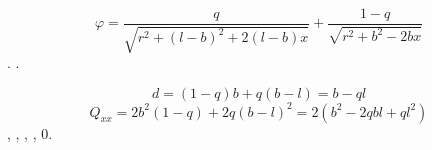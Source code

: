 \documentclass[a4paper]{article}
\begin{document}
\begin{equation*}
\varphi =\frac q{\sqrt{r^2+(l-b)^2+2(l-b)x}}+\frac{1-q}{\sqrt{r^2+b^2-2\mathit{bx}}}
\end{equation*}
{\CYRP}{\cyro}{\cyrt}{\cyre}{\cyrn}{\cyrc}{\cyri}{\cyra}{\cyrl} {\cyrt}{\cyra}{\cyrk}{\cyro}{\cyrishrt}
{\cyrs}{\cyri}{\cyrs}{\cyrt}{\cyre}{\cyrm}{\cyrery} {\cyrm}{\cyro}{\cyrzh}{\cyrn}{\cyro}
{\cyrp}{\cyrr}{\cyre}{\cyrd}{\cyrs}{\cyrt}{\cyra}{\cyrv}{\cyri}{\cyrt}{\cyrsftsn} {\cyrv} {\cyrv}{\cyri}{\cyrd}{\cyre}
{\cyrs}{\cyru}{\cyrm}{\cyrm}{\cyrery}
{\cyrk}{\cyru}{\cyrl}{\cyro}{\cyrn}{\cyro}{\cyrv}{\cyrs}{\cyrk}{\cyro}{\cyrg}{\cyro} {\cyri}
{\cyrd}{\cyri}{\cyrp}{\cyro}{\cyrl}{\cyrsftsn}{\cyrn}{\cyro}{\cyrg}{\cyro}
{\cyrp}{\cyro}{\cyrt}{\cyre}{\cyrn}{\cyrc}{\cyri}{\cyra}{\cyrl}{\cyra}.
{\CYRR}{\cyra}{\cyrs}{\cyrs}{\cyrch}{\cyri}{\cyrt}{\cyra}{\cyre}{\cyrm}
{\cyrd}{\cyri}{\cyrp}{\cyro}{\cyrl}{\cyrsftsn}{\cyrn}{\cyrery}{\cyrishrt} {\cyri}
{\cyrk}{\cyrv}{\cyra}{\cyrd}{\cyrr}{\cyru}{\cyrp}{\cyro}{\cyrl}{\cyrsftsn}{\cyrn}{\cyrery}{\cyrishrt}
{\cyrm}{\cyro}{\cyrm}{\cyre}{\cyrn}{\cyrt}{\cyrery} {\cyrt}{\cyra}{\cyrk}{\cyro}{\cyrishrt}
{\cyrs}{\cyri}{\cyrs}{\cyrt}{\cyre}{\cyrm}{\cyrery}.

\begin{equation*}
d=\left(1-q\right)b+q\left(b-l\right)=b-\mathit{ql}
\end{equation*}
\begin{equation*}
Q_{\mathit{xx}}=2b^2\left(1-q\right)+2q\left(b-l\right)^2=2\left(b^2-2q\mathit{bl}+ql^2\right)
\end{equation*}
{\CYRM}{\cyrery} {\cyrr}{\cyre}{\cyrsh}{\cyra}{\cyrl}{\cyri} {\cyrz}{\cyra}{\cyrd}{\cyra}{\cyrch}{\cyru} {\cyro}
{\cyrr}{\cyri}{\cyrd}{\cyrb}{\cyre}{\cyrr}{\cyrg}{\cyro}{\cyrv}{\cyrs}{\cyrk}{\cyro}{\cyrm}
{\cyrerev}{\cyrl}{\cyre}{\cyrk}{\cyrt}{\cyrr}{\cyro}{\cyrn}{\cyre} {\cyrv}
{\cyrd}{\cyri}{\cyrp}{\cyro}{\cyrl}{\cyrsftsn}{\cyrn}{\cyro}{\cyrm}
{\cyrp}{\cyrr}{\cyri}{\cyrb}{\cyrl}{\cyri}{\cyrzh}{\cyre}{\cyrn}{\cyri}{\cyri},
{\cyrp}{\cyro}{\cyrerev}{\cyrt}{\cyro}{\cyrm}{\cyru},
{\cyrp}{\cyro}{\cyrl}{\cyrsftsn}{\cyrz}{\cyru}{\cyrya}{\cyrs}{\cyrsftsn}
{\cyrn}{\cyre}{\cyri}{\cyrn}{\cyrv}{\cyra}{\cyrr}{\cyri}{\cyra}{\cyrn}{\cyrt}{\cyrn}{\cyro}{\cyrs}{\cyrt}{\cyrsftsn}{\cyryu}
{\cyrv}{\cyrery}{\cyrs}{\cyrsh}{\cyri}{\cyrh}
{\cyrm}{\cyru}{\cyrl}{\cyrsftsn}{\cyrt}{\cyri}{\cyrp}{\cyro}{\cyrl}{\cyrsftsn}{\cyrn}{\cyrery}{\cyrh}
{\cyrm}{\cyro}{\cyrm}{\cyre}{\cyrn}{\cyrt}{\cyro}{\cyrv} {\cyrs}{\cyri}{\cyrs}{\cyrt}{\cyre}{\cyrm}{\cyrery} {\cyrv}
{\cyrz}{\cyra}{\cyrv}{\cyri}{\cyrs}{\cyri}{\cyrm}{\cyro}{\cyrs}{\cyrt}{\cyri} {\cyro}{\cyrt}
{\cyrv}{\cyrery}{\cyrb}{\cyro}{\cyrr}{\cyra} {\cyrs}{\cyri}{\cyrs}{\cyrt}{\cyre}{\cyrm}{\cyrery}
{\cyro}{\cyrt}{\cyrs}{\cyrch}{\cyre}{\cyrt}{\cyra}, {\cyrv}{\cyrery}{\cyrb}{\cyre}{\cyrr}{\cyre}{\cyrm}
{\cyrs}{\cyri}{\cyrs}{\cyrt}{\cyre}{\cyrm}{\cyru} {\cyro}{\cyrt}{\cyrs}{\cyrch}{\cyre}{\cyrt}{\cyra}
{\cyrt}{\cyra}{\cyrk}{\cyri}{\cyrm} {\cyro}{\cyrb}{\cyrr}{\cyra}{\cyrz}{\cyro}{\cyrm},
{\cyrch}{\cyrt}{\cyro}{\cyrb}{\cyrery}
{\cyrk}{\cyrv}{\cyra}{\cyrd}{\cyrr}{\cyru}{\cyrp}{\cyro}{\cyrl}{\cyrsftsn}{\cyrn}{\cyrery}{\cyrishrt}
{\cyrch}{\cyrl}{\cyre}{\cyrn} {\cyrb}{\cyrery}{\cyrl} {\cyrr}{\cyra}{\cyrv}{\cyre}{\cyrn} 0.
\end{document}
